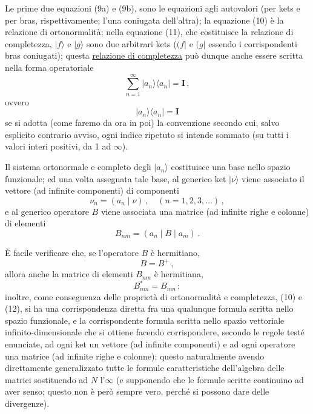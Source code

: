\documentclass[11pt, a4paper]{book}
\numberwithin{equation}{section}
\begin{document}
Le prime due equazioni (9a) e (9b), sono le equazioni agli autovalori (per kets e per bras, rispettivamente; l'una coniugata dell'altra); la equazione (10) è la relazione di ortonormalità; nella equazione (11), che costituisce la relazione di completezza, $|f\rangle$ e $|g\rangle$ sono due arbitrari kets ($(f|$ e $(g|$ essendo i corrispondenti bras coniugati); questa \uline{relazione di completezza} può dunque anche essere scritta nella forma operatoriale
\begin{equation}
\sum_{n=1}^{\infty}|a_n\rangle\langle a_n|=\mathbf{I}\,, \tag{12a}
\end{equation}
ovvero
\begin{equation}
|a_n\rangle\langle a_n|=\mathbf{I} \tag{12b}
\end{equation}
se si adotta (come faremo da ora in poi) la convenzione secondo cui, salvo esplicito contrario avviso, ogni indice ripetuto si intende sommato (su tutti i valori interi positivi, da 1 ad $\infty$).

Il sistema ortonormale e completo degli $|a_n\rangle$ costituisce una base nello spazio funzionale; ed una volta assegnata tale base, al generico ket $|\nu\rangle$ viene associato il vettore (ad infinite componenti) di componenti
\begin{equation}
\nu_n=(a_n\mid\nu)\,,\quad(n=1,2,3,\ldots)\,, \tag{13}
\end{equation}
e al generico operatore $B$ viene associata una matrice (ad infinite righe e colonne) di elementi
\begin{equation}
B_{nm}=(a_n\mid B\mid a_m)\,. \tag{14}
\end{equation}

È facile verificare che, se l'operatore $B$ è hermitiano,
\begin{equation}
B=B^+\,, \tag{15a}
\end{equation}
allora anche la matrice di elementi $B_{nm}$ è hermitiana,
\begin{equation}
B_{nm}^*=B_{mn}\,; \tag{15b}
\end{equation}
inoltre, come conseguenza delle proprietà di ortonormalità e completezza, (10) e (12), si ha una corrispondenza diretta fra una qualunque formula scritta nello spazio funzionale, e la corrispondente formula scritta nello spazio vettoriale infinito-dimensionale che si ottiene facendo corrispondere, secondo le regole testé enunciate, ad ogni ket un vettore (ad infinite componenti) e ad ogni operatore una matrice (ad infinite righe e colonne); questo naturalmente avendo direttamente generalizzato tutte le formule caratteristiche dell'algebra delle matrici sostituendo ad $N$ l'$\infty$ (e supponendo che le formule scritte continuino ad aver senso; questo non è però sempre vero, perché si possono dare delle divergenze).
\end{document}

